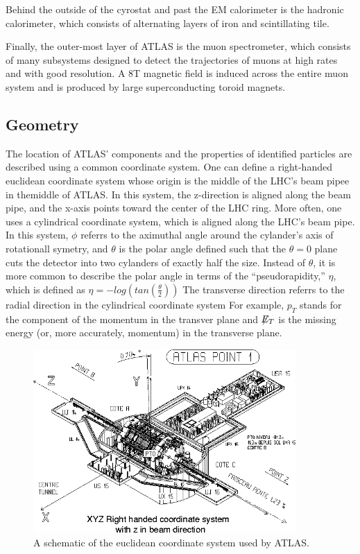 Behind the outside of the cyrostat and past the EM calorimeter is the hadronic calorimeter, which consists of alternating layers of iron and scintillating tile.

Finally, the outer-most layer of ATLAS is the muon spectrometer, which consists of many subsystems designed to detect the trajectories of muons at high rates and with good resolution. 
A 8T magnetic field is induced across the entire muon system and is produced by large superconducting toroid magnets.


\subsection{Geometry}
The location of ATLAS' components and the properties of identified particles are described using a common coordinate system.
One can define a right-handed euclidean coordinate system whose origin is the middle of the LHC's beam pipee in themiddle of ATLAS.
In this system, the z-direction is aligned along the beam pipe, and the x-axis points toward the center of the LHC ring.
More often, one uses a cylindrical coordinate system, which is aligned along the LHC's beam pipe.
In this system, $\phi$ referrs to the aximuthal angle around the cylander's axis of rotationall symetry, and $\theta$ is the polar angle defined such that the $\theta=0$ plane cuts the detector into two cylanders of exactly half the size.
Instead of $\theta$, it is more common to describe the polar angle in terms of the ``pseudorapidity,'' $\eta$, which is defined as $\eta = -log(tan(\frac{\theta}{2}))$
The transverse direction referrs to the radial direction in the cylindrical coordinate system 
For example, $p_{T}$ stands for the component of the momentum in the transver plane and $\not\!\!{E_{T}}$ is the missing energy (or, more accurately, momentum) in the transverse plane.


\begin{figure}
  \begin{center}
    \includegraphics[width=100mm]{figures/atlas/AtlasCoordinateSystem.png}
  \end{center}
  \caption{A schematic of the euclidean coordinate system used by ATLAS.}
  \label{img:AtlasCoordinateSystem}
\end{figure}

